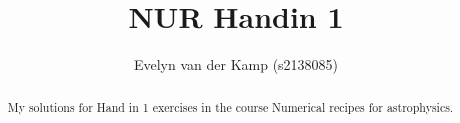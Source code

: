 \documentclass[a4paper,10pt]{article}
\title{NUR Handin 1}
\author{Evelyn van der Kamp (s2138085)}
\begin{document}
\maketitle

\begin{abstract}
 My solutions for Hand in 1 exercises in the 
 course Numerical recipes for astrophysics.
\end{abstract}




\end{document}
